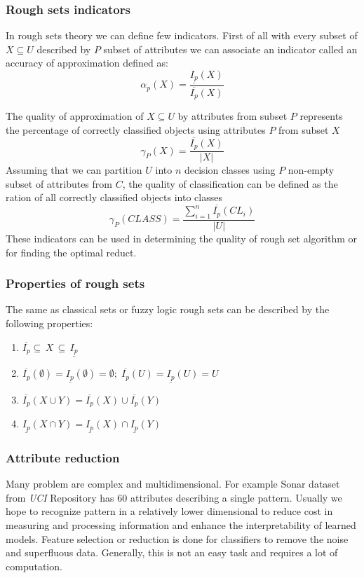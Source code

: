 \subsubsection{Rough sets indicators}
\label{cha:Rough_sets_indicators}
In rough sets theory we can define few indicators. First of all with every 
subset of $X \subseteq U$ described by $P$ subset of attributes we can 
associate an indicator called an accuracy of approximation defined as:
$$\alpha_p(X)=\frac{\underline{I_p}(X)}{\overline{I_p}(X)}$$

The quality of approximation of $X \subseteq U$ by attributes from subset $P$
represents the percentage of correctly classified objects using attributes $P$
from subset $X$
$$\gamma_P(X) = \frac{\overline{I_p}(X)}{|X|}$$
Assuming that we can partition $U$ into $n$ decision classes using $P$
non-empty subset of attributes from $C$, the quality of classification can be
defined as the ration of all correctly classified objects into classes
$$\gamma_P(CLASS) = \frac{\sum_{i=1}^{n}\overline{I_p}(CL_i)}{|U|}$$
These indicators can be used in determining the quality of rough set algorithm
or for finding the optimal reduct.
\subsubsection{Properties of rough sets}
The same as classical sets or fuzzy logic rough sets can be described by the
following properties:
\begin{enumerate}
    \item $\overline{I_p} \subseteq \, X \, \subseteq \, \underline{I_p}$
    \item $\overline{I_p}(\emptyset) = \underline{I_p}(\emptyset) = \emptyset;
        \;
        \overline{I_p}(U) = \underline{I_p}(U) = U $
    \item $\overline{I_p}(X \cup Y) = \overline{I_p}(X) \cup \overline{I_p}(Y)$
    \item $\underline{I_p}(X \cap Y) = \underline{I_p}(X) \cap \underline{I_p}(Y)$
\end{enumerate}

\subsubsection{Attribute reduction}
\label{cha:Rough_set_attribute_reduction}
Many problem are complex and multidimensional. For example Sonar dataset from
\textit{UCI} Repository has 60 attributes describing a single pattern. 
Usually we hope to recognize pattern in a relatively
lower dimensional to reduce cost in measuring and processing information and
enhance the interpretability of learned models. Feature selection or reduction 
is done for classifiers to remove the noise and superfluous data. Generally,
this is not an easy task and requires a lot of computation. 


